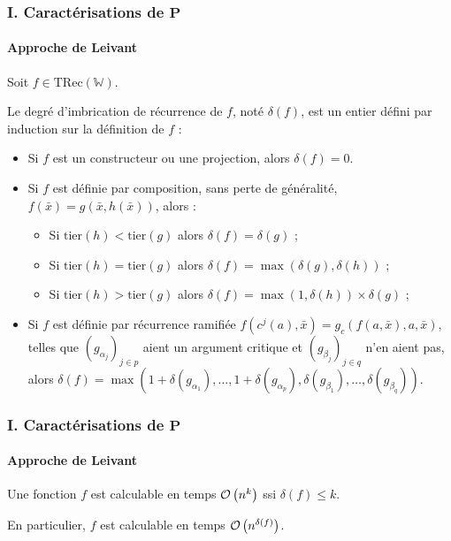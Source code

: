 \documentclass[10pt]{beamer}
\newcommand{\TRec}[1]{\text{TRec}\left(\mathbb{#1}\right)}
\begin{document}
	\begin{frame}
		\frametitle{I. Caractérisations de $\textbf{P}$}
		\framesubtitle{Approche de Leivant}
		
		
		\begin{defn}
			
			Soit $f \in \TRec{W}$. 
			
			Le degré d'imbrication de récurrence de $f$, noté $\delta(f)$, est un entier défini par induction sur la définition de $f$ :
			
			\begin{itemize}[itemsep=-1mm]
				\item 	Si $f$ est un constructeur ou une projection, alors $\delta(f) = 0$.
				\item 	Si $f$ est définie par composition, sans perte de généralité, $f(\bar{x}) = g\left( \bar{x}, h\left( \bar{x}\right)\right)$, alors :
				
				\begin{itemize}[itemsep=-1mm]
					\item 	Si $\text{tier}(h) < \text{tier}(g)$ alors $\delta(f) = \delta(g)$ ;
					\item 	Si $\text{tier}(h) = \text{tier}(g)$ alors $\delta(f) = \max\left(\delta(g), \delta(h)\right)$ ;
					\item 	Si $\text{tier}(h) > \text{tier}(g)$ alors $\delta(f) = \max\left(1, \delta(h)\right) \times \delta(g)$ ;
				\end{itemize}
				
				\item 	Si $f$ est définie par récurrence ramifiée $f(c^j(a), \bar{x}) = g_{c}\left( f(a, \bar{x}), a, \bar{x} \right)$, telles que $\left( g_{\alpha_j}\right)_{j\in p}$ aient un argument critique et $\left( g_{\beta_j}\right)_{j\in q}$ n'en aient pas, alors $\delta(f) = \max\left( 1 + \delta\left( g_{\alpha_1} \right), \dots,  1 + \delta\left( g_{\alpha_p} \right), \delta\left( g_{\beta_1} \right), \dots,  \delta\left( g_{\beta_q} \right)\right)$. 
			\end{itemize}
		\end{defn}
	\end{frame}
	
	\begin{frame}
		\frametitle{I. Caractérisations de $\textbf{P}$}
		\framesubtitle{Approche de Leivant}
		
		\begin{thm}
			Une fonction $f$ est calculable en temps $\mathcal{O}\left( n^k \right)$ ssi $\delta(f) \leqslant k$.
			
			En particulier, $f$ est calculable en temps $\mathcal{O}\left( n^{\delta(f)} \right)$.
		\end{thm}
		
		
	\end{frame}
	
\end{document}
